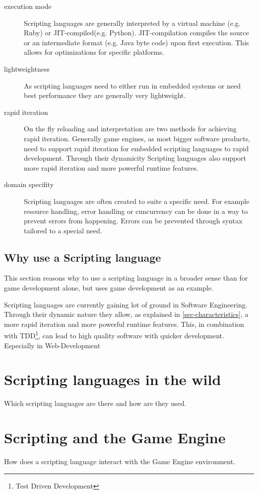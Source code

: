 \documentclass{article}
\begin{document}
\begin{description}
\item[execution mode] Scripting languages are generally interpreted by a
virtual machine (e.g. Ruby) or JIT-compiled(e.g. Python). JIT-compilation
compiles the source or an intermediate format (e.g. Java byte code) upon first
execution. This allows for optimizations for specific platforms.
\item[lightweightness] As scripting languages need to either run in embedded
systems or need best performance they are generally very lightweight.
\item[rapid iteration] On the fly reloading and interpretation are two methods
for achieving rapid iteration. Generally game engines, as most bigger software
products, need to support rapid iteration for embedded scripting languages to
rapid development. Through their dynamicity Scripting languages also support
more rapid iteration and more powerful runtime features.
\item[domain specifity] Scripting languages are often created to suite a
specific need. For example resource handling, error handling or cuncurrency can
be done in a way to prevent errors from happening. Errors can be prevented
through syntax tailored to a special need.
\end{description}

\subsection{Why use a Scripting language}
This section reasons why to use a scripting language in a broader sense than
for game development alone, but uses game development as an example.

Scripting languages are currently gaining lot of ground in Software Engineering.
Through their dynamic nature they allow, as explained in
\ref{sec-characteristics}, a more rapid iteration and more powerful runtime
features. This, in combination with TDD\footnote{Test Driven Development}, can
lead to high quality software with quicker development. Especially in
Web-Development 

\section{Scripting languages in the wild}
Which scripting languages are there and how are they used.

\section{Scripting and the Game Engine}
How does a scripting language interact with the Game Engine environment.
\end{document}
